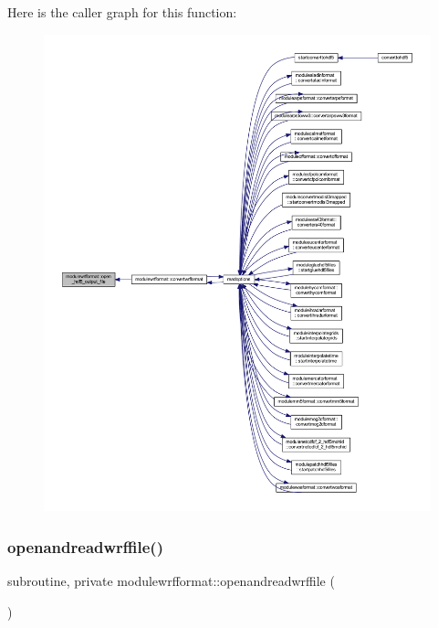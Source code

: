 Here is the caller graph for this function\+:\nopagebreak
\begin{figure}[H]
\begin{center}
\leavevmode
\includegraphics[width=350pt]{namespacemodulewrfformat_a477dfcb5abd2d3fef1a7de09f09e0216_icgraph}
\end{center}
\end{figure}
\mbox{\label{namespacemodulewrfformat_ace4676af115f32ceeda15123d47bd5c8}} 
\subsubsection{\texorpdfstring{openandreadwrffile()}{openandreadwrffile()}}
{\footnotesize\ttfamily subroutine, private modulewrfformat\+::openandreadwrffile (\begin{DoxyParamCaption}{ }\end{DoxyParamCaption})\hspace{0.3cm}{\ttfamily [private]}}

